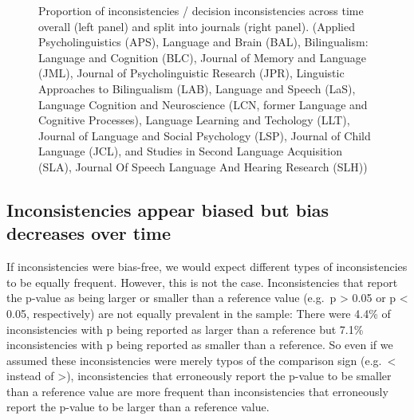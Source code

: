 \documentclass[
  doc,
  longtable,
  nolmodern,
  notxfonts,
  notimes,
  colorlinks=true,linkcolor=blue,citecolor=blue,urlcolor=blue]{apa7}
\begin{document}
\begin{figure}

\caption{\label{fig-year-prop}Proportion of inconsistencies / decision
inconsistencies across time overall (left panel) and split into journals
(right panel). (Applied Psycholinguistics (APS), Language and Brain
(BAL), Bilingualism: Language and Cognition (BLC), Journal of Memory and
Language (JML), Journal of Psycholinguistic Research (JPR), Linguistic
Approaches to Bilingualism (LAB), Language and Speech (LaS), Language
Cognition and Neuroscience (LCN, former Language and Cognitive
Processes), Language Learning and Techology (LLT), Journal of Language
and Social Psychology (LSP), Journal of Child Language (JCL), and
Studies in Second Language Acquisition (SLA), Journal Of Speech Language
And Hearing Research (SLH))}


\end{figure}%

\subsection{Inconsistencies appear biased but bias decreases over
time}\label{sec-bias}

If inconsistencies were bias-free, we would expect different types of
inconsistencies to be equally frequent. However, this is not the case.
Inconsistencies that report the p-value as being larger or smaller than
a reference value (e.g.~p \textgreater{} 0.05 or p \textless{} 0.05,
respectively) are not equally prevalent in the sample: There were 4.4\%
of inconsistencies with p being reported as larger than a reference but
7.1\% inconsistencies with p being reported as smaller than a reference.
So even if we assumed these inconsistencies were merely typos of the
comparison sign (e.g.~\textless{} instead of \textgreater),
inconsistencies that erroneously report the p-value to be smaller than a
reference value are more frequent than inconsistencies that erroneously
report the p-value to be larger than a reference value.
\end{document}
